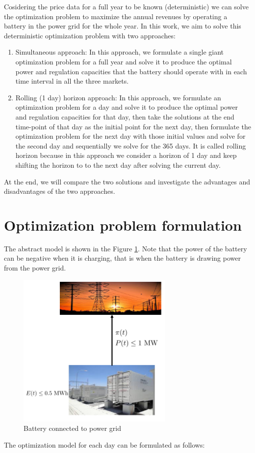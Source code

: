 \documentclass[11pt,twoside]{article}
\begin{document}
Cosidering the price data for a full year to be known (deterministic) we can solve the optimization problem to maximize the annual revenues by operating a battery in the power grid for the whole year. In this work, we aim to solve this deterministic optimization problem with two approaches:
\begin{enumerate}
\item Simultaneous approach: In this approach, we formulate a single giant optimization problem for a full year and solve it to produce the optimal power and regulation capacities that the battery should operate with in each time interval in all the three markets. 
\item Rolling (1 day) horizon approach: In this approach, we formulate an optimization problem for a day and solve it to produce the optimal power and regulation capacities for that day, then take the solutions at the end time-point of that day as the initial point for the next day, then formulate the optimization problem for the next day with those initial values and solve for the second day and sequentially we solve for the 365 days. It is called rolling horizon because in this approach we consider a horizon of 1 day and keep shifting the horizon to to the next day after solving the current day.
\end{enumerate}

At the end, we will compare the two solutions and investigate the advantages and disadvantages of the two approaches.

\section{Optimization problem formulation}
The abstract model is shown in the Figure \ref{model}. Note that the power of the battery can be negative when it is charging, that is when the battery is drawing power from the power grid.
\begin{figure}[h!tp]
\centering
\includegraphics[width=3in]{Figures/model.pdf}
\caption{Battery connected to power grid}\label{model}
\end{figure}
The optimization model for each day can be formulated as follows:\\
\end{document}
